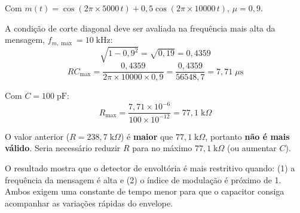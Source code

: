 \documentclass[11pt,a4paper]{article}
\begin{document}
\begin{resolucao}

Com $m(t) = \cos(2\pi \times 5000\,t) + 0{,}5\cos(2\pi \times 10000\,t)$, $\mu = 0{,}9$.

A condição de corte diagonal deve ser avaliada na frequência mais alta da mensagem, $f_{m,\max} = 10\;\text{kHz}$:
\[
  \sqrt{1 - 0{,}9^2} = \sqrt{0{,}19} = 0{,}4359
\]
\[
  RC_{\max} = \frac{0{,}4359}{2\pi \times 10000 \times 0{,}9} = \frac{0{,}4359}{56548{,}7} = \boxed{7{,}71\;\mu\text{s}}
\]

Com $C = 100\;\text{pF}$:
\[
  R_{\max} = \frac{7{,}71 \times 10^{-6}}{100 \times 10^{-12}} = 77{,}1\;\text{k}\Omega
\]

O valor anterior ($R = 238{,}7\;\text{k}\Omega$) é \textbf{maior} que $77{,}1\;\text{k}\Omega$, portanto \textbf{não é mais válido}. Seria necessário reduzir $R$ para no máximo $77{,}1\;\text{k}\Omega$ (ou aumentar $C$).

O resultado mostra que o detector de envoltória é mais restritivo quando: (1) a frequência da mensagem é alta e (2) o índice de modulação é próximo de 1. Ambos exigem uma constante de tempo menor para que o capacitor consiga acompanhar as variações rápidas do envelope.
\end{resolucao}
\end{document}
